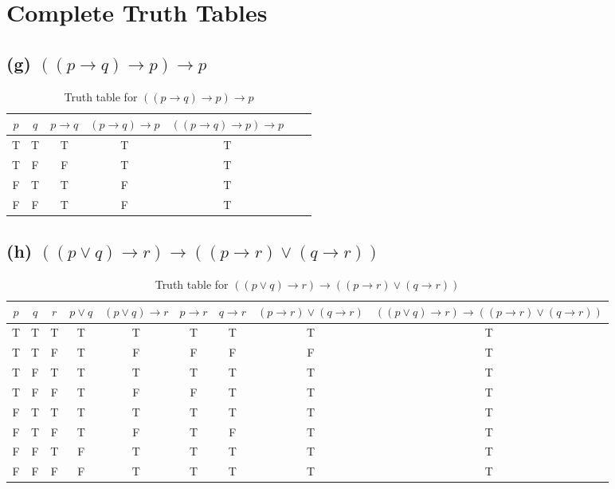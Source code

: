 \documentclass{article}
\begin{document}
\section*{Complete Truth Tables}

\subsection*{(g) $((p \rightarrow q) \rightarrow p) \rightarrow p$}

\begin{table}[h]
\centering
\begin{tabular}{ccc|ccc|c}
\toprule
$p$ & $q$ & $p \rightarrow q$ & $(p \rightarrow q) \rightarrow p$ & $((p \rightarrow q) \rightarrow p) \rightarrow p$ \\
\midrule
T & T & T & T & T \\
T & F & F & T & T \\
F & T & T & F & T \\
F & F & T & F & T \\
\bottomrule
\end{tabular}
\caption{Truth table for $((p \rightarrow q) \rightarrow p) \rightarrow p$}
\end{table}

\newpage
\subsection*{(h) $((p \vee q) \rightarrow r) \rightarrow ((p \rightarrow r) \vee (q \rightarrow r))$}

\begin{table}[h]
\centering
\begin{tabular}{ccc|ccccc|c}
\toprule
$p$ & $q$ & $r$ & $p \vee q$ & $(p \vee q) \rightarrow r$ & $p \rightarrow r$ & $q \rightarrow r$ & $(p \rightarrow r) \vee (q \rightarrow r)$ & $((p \vee q) \rightarrow r) \rightarrow ((p \rightarrow r) \vee (q \rightarrow r))$ \\
\midrule
T & T & T & T & T & T & T & T & T \\
T & T & F & T & F & F & F & F & T \\
T & F & T & T & T & T & T & T & T \\
T & F & F & T & F & F & T & T & T \\
F & T & T & T & T & T & T & T & T \\
F & T & F & T & F & T & F & T & T \\
F & F & T & F & T & T & T & T & T \\
F & F & F & F & T & T & T & T & T \\
\bottomrule
\end{tabular}
\caption{Truth table for $((p \vee q) \rightarrow r) \rightarrow ((p \rightarrow r) \vee (q \rightarrow r))$}
\end{table}
\end{document}
